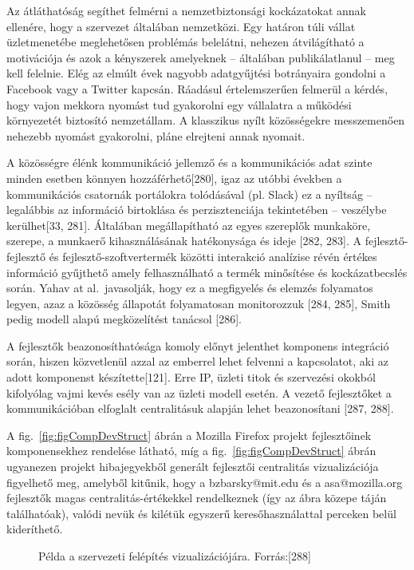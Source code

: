 \documentclass[12pt,magyar,a4paper,oneside]{scrreprt}
\begin{document}
Az átláthatóság segíthet felmérni a nemzetbiztonsági kockázatokat annak
ellenére, hogy a szervezet általában nemzetközi. Egy határon túli vállat
üzletmenetébe meglehetősen problémás belelátni, nehezen átvilágítható a
motivációja és azok a kényszerek amelyeknek -- általában publikálatlanul
-- meg kell felelnie. Elég az elmúlt évek nagyobb adatgyűjtési
botrányaira gondolni a Facebook vagy a Twitter kapcsán. Ráadásul
értelemszerűen felmerül a kérdés, hogy vajon mekkora nyomást tud
gyakorolni egy vállalatra a működési környezetét biztosító nemzetállam.
A klasszikus nyílt közösségekre messzemenően nehezebb nyomást
gyakorolni, pláne elrejteni annak nyomait.

A közösségre élénk kommunikáció jellemző és a kommunikációs adat szinte
minden esetben könnyen hozzáférhető{[}280{]}, igaz az utóbbi években a
kommunikációs csatornák portálokra tolódásával (pl. Slack) ez a nyíltság
-- legalábbis az információ birtoklása és perzisztenciája tekintetében
-- veszélybe kerülhet{[}33, 281{]}. Általában megállapítható az egyes
szereplők munkaköre, szerepe, a munkaerő kihasználásának hatékonysága és
ideje {[}282, 283{]}. A fejlesztő-fejlesztő és fejlesztő-szoftvertermék
közötti interakció analízise révén értékes információ gyűjthető amely
felhasználható a termék minősítése és kockázatbecslés során. Yahav at
al.~javasolják, hogy ez a megfigyelés és elemzés folyamatos legyen, azaz
a közösség állapotát folyamatosan monitorozzuk {[}284, 285{]}, Smith
pedig modell alapú megközelítést tanácsol {[}286{]}.

A fejlesztők beazonosíthatósága komoly előnyt jelenthet komponens
integráció során, hiszen közvetlenül azzal az emberrel lehet felvenni a
kapcsolatot, aki az adott komponenst készítette{[}121{]}. Erre IP,
üzleti titok és szervezési okokból kifolyólag vajmi kevés esély van az
üzleti modell esetén. A vezető fejlesztőket a kommunikációban elfoglalt
centralitásuk alapján lehet beazonosítani {[}287, 288{]}.

A fig.~\ref{fig:figCompDevStruct} ábrán a Mozilla Firefox projekt
fejlesztőinek komponensekhez rendelése látható, míg a
fig.~\ref{fig:figCompDevStruct} ábrán ugyanezen projekt hibajegyekből
generált fejlesztői centralitás vizualizációja figyelhető meg, amelyből
kitűnik, hogy a bzbarsky@mit.edu és a asa@mozilla.org fejlesztők magas
centralitás-értékekkel rendelkeznek (így az ábra közepe táján
találhatóak), valódi nevük és kilétük egyszerű keresőhasználattal
perceken belül kideríthető.

\begin{figure}
\centering


\caption{Példa a szervezeti felépítés vizualizációjára.
Forrás:{[}288{]}}

\label{fig:OSSD_struct}

\end{figure}
\end{document}
